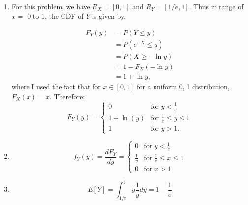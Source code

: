 \begin{problem}{4} $ $
\begin{enumerate}
\item For this problem, we have $R_X = [0, 1]$ and $R_Y = [1/e, 1]$.  Thus in range of $x=$ 0 to 1, the CDF of $Y$ is given by:

\begin{align*}
F_Y(y) & = P(Y \le y) \\
& = P(e^{-X} \le y ) \\
& = P(X \ge -\ln{y} ) \\
& = 1-F_X(-\ln{y} ) \\
& = 1+\ln y,
\end{align*}
where I used the fact that for $x \in [0, 1]$ for a uniform 0, 1 distribution, $F_X(x)=x$.
Therefore:
\[
  F_Y(y) =
  \begin{cases}
                                   0 & \text{for $y<\frac{1}{e}$} \\
                                   1+\ln(y) & \text{for $\frac{1}{e} \le y \le 1$} \\
                                   1 & \text{for $y>1$}.
  \end{cases}
\]

\item
\[
  f_Y(y) = \frac{ d F_Y}{dy}=
  \begin{cases}
                                   0 & \text{for $y<\frac{1}{e}$} \\
                                   \frac{1}{y} & \text{for $\frac{1}{e} \le x \le 1$} \\
                                   0 & \text{for $x>1$}
  \end{cases}
\]

\item

\begin{equation*}
E[Y] = \int_{1/e}^1 y \frac{1}{y} dy = 1-\frac{1}{e}
\end{equation*}

\end{enumerate}

\end{problem}



